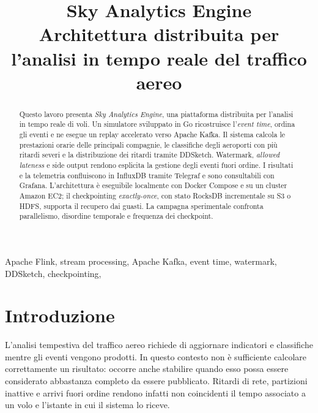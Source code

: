 \documentclass[conference]{IEEEtran}
\begin{document}
\title{Sky Analytics Engine\\
\vspace{0.15cm}\large Architettura distribuita per l'analisi in tempo reale del traffico aereo}

\author{
    \and
}

\maketitle
\thispagestyle{headings}

\begin{abstract}
Questo lavoro presenta \emph{Sky Analytics Engine}, una piattaforma distribuita per l'analisi in tempo reale di voli.
Un simulatore sviluppato in Go ricostruisce l'\emph{event time}, ordina gli eventi e ne esegue un replay accelerato verso Apache Kafka.
Il sistema calcola le prestazioni orarie delle principali compagnie, le classifiche degli aeroporti con più ritardi severi e la distribuzione dei ritardi tramite DDSketch.
Watermark, \emph{allowed lateness} e side output rendono esplicita la gestione degli eventi fuori ordine.
I risultati e la telemetria confluiscono in InfluxDB tramite Telegraf e sono consultabili con Grafana.
L'architettura è eseguibile localmente con Docker Compose e su un cluster Amazon EC2; il checkpointing \emph{exactly-once}, con stato RocksDB incrementale su S3 o HDFS, supporta il recupero dai guasti.
La campagna sperimentale confronta parallelismo, disordine temporale e frequenza dei checkpoint.
\end{abstract}

\begin{IEEEkeywords}
Apache Flink, stream processing, Apache Kafka, event time, watermark, DDSketch, checkpointing, 
\end{IEEEkeywords}

\section{Introduzione}\label{sec:introduction}
L'analisi tempestiva del traffico aereo richiede di aggiornare indicatori e classifiche mentre gli eventi vengono prodotti.
In questo contesto non è sufficiente calcolare correttamente un risultato: occorre anche stabilire quando esso possa essere considerato abbastanza completo da essere pubblicato.
Ritardi di rete, partizioni inattive e arrivi fuori ordine rendono infatti non coincidenti il tempo associato a un volo e l'istante in cui il sistema lo riceve.
\end{document}
